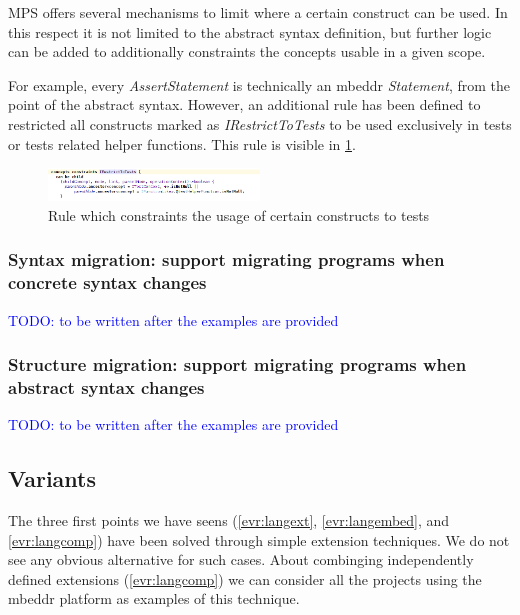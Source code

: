 \documentclass[preprint,numbers,10pt]{sigplanconf}
\newcommand\comment[1]{\textcolor{blue}{#1}}
\begin{document}
MPS offers several mechanisms to limit where a certain construct can be used. In this respect it is not limited to the abstract syntax definition, but further logic can be added to additionally constraints the concepts usable in a given scope.

For example, every \emph{AssertStatement} is technically an mbeddr \emph{Statement}, from the point of the abstract syntax. However, an additional rule has been defined to restricted all constructs marked as \emph{IRestrictToTests} to be used exclusively in tests or tests related helper functions. This rule is visible in \ref{fig:restrictedtotest}.

\begin{figure}[p]
	\centering
	\includegraphics[width=0.50\textwidth]{screens/restricted_to_test.png}
	\caption{Rule which constraints the usage of certain constructs to tests}
	\label{fig:restrictedtotest}
\end{figure}

\subsubsection{Syntax migration: support migrating programs when concrete syntax changes}
\label{evr:synmigr}

\comment{TODO: to be written after the examples are provided}

\subsubsection{Structure migration: support migrating programs when abstract syntax changes}
\label{evr:structmigr}

\comment{TODO: to be written after the examples are provided}

\subsection{Variants}

The three first points we have seens (\ref{evr:langext}, \ref{evr:langembed}, and \ref{evr:langcomp}) have been solved through simple extension techniques. We do not see any obvious alternative for such cases. About combinging independently defined extensions (\ref{evr:langcomp}) we can consider all the projects using the mbeddr platform as examples of this technique.
\end{document}
